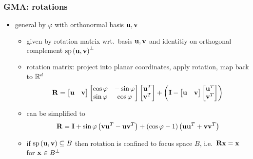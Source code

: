 \documentclass[t]{beamer} %
\begin{document}
\begin{frame}
  \frametitle{GMA: rotations}

  \begin{itemize}
  \item general  by $\varphi$ with orthonormal basis $\vu, \vv$
    \begin{itemize}
    \item[\hand] given by rotation matrix wrt.\ basis $\vu, \vv$ and identitiy on orthogonal complement $\Span{\vu, \vv}^{\perp}$
    \item[\hand] rotation matrix: project into planar coordinates, apply rotation, map back to $\mathbb{R}^d$
      \[
        \mathbf{R} =
        \begin{bmatrix}
          \vu & \vv
        \end{bmatrix}
        \begin{bmatrix}
          \cos \varphi & -\sin \varphi \\
          \sin \varphi & \cos \varphi
        \end{bmatrix}
        \begin{bmatrix}
          \vu^T \\
          \vv^T
        \end{bmatrix}
        +
        \left(
          \mathbf{I} -
          \begin{bmatrix}
            \vu & \vv
          \end{bmatrix}
          \begin{bmatrix}
            \vu^T \\
            \vv^T
          \end{bmatrix}
        \right)
      \]
    \item[\hand] can be simplified to
      \[
        \mathbf{R} =
        \mathbf{I} +
        \sin \varphi \left(
          \vv \vu^T - \vu \vv^T
        \right) +
        (\cos \varphi - 1) \left(
          \vu \vu^T + \vv \vv^T
        \right)
      \]
    \item[\hand] if $\Span{\vu, \vv} \subseteq B$ then rotation is confined to focus space $B$, i.e.\ $\mathbf{R}\vx = \vx$ for $\vx\in B^{\perp}$
    \end{itemize}
  \end{itemize}
\end{frame}
\end{document}
